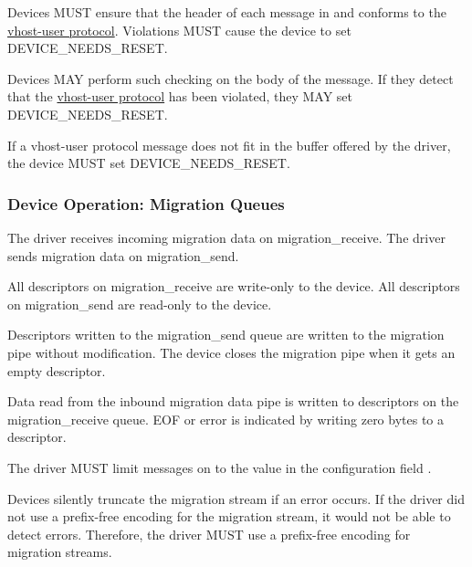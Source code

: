 Devices MUST ensure that the header of each message in
 and 
conforms to the
\hyperref[intro:Vhost-user Protocol]{vhost-user protocol}.
Violations MUST cause the device to set DEVICE_NEEDS_RESET.

Devices MAY perform such checking on the body of the message. If
they detect that the
\hyperref[intro:Vhost-user Protocol]{vhost-user protocol} has
been violated, they MAY set DEVICE_NEEDS_RESET.

If a vhost-user protocol message does not fit in the buffer
offered by the driver, the device MUST set DEVICE_NEEDS_RESET.

\subsubsection{Device Operation: Migration Queues}\label{sec:Device Types / Vhost-Guest Device / Device Operation / Device Operation: Migration Queues}

The driver receives incoming migration data on migration_receive.
The driver sends migration data on migration_send.

All descriptors on migration_receive are write-only to the
device. All descriptors on migration_send are read-only to the
device.

Descriptors written to the migration_send queue are written to
the migration pipe without modification. The device closes the
migration pipe when it gets an empty descriptor.

Data read from the inbound migration data pipe is written to
descriptors on the migration_receive queue. EOF or error is
indicated by writing zero bytes to a descriptor.


The driver MUST limit messages on  to the
value in the configuration field
.

Devices silently truncate the migration stream if an error
occurs. If the driver did not use a prefix-free encoding for
the migration stream, it would not be able to detect errors.
Therefore, the driver MUST use a prefix-free encoding for
migration streams.

